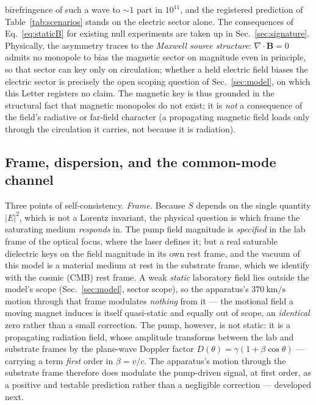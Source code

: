 \documentclass[aps,prd,twocolumn,superscriptaddress,nofootinbib,longbibliography]{revtex4-2}
\begin{document}
birefringence of such a wave to $\sim\!1$ part in $10^{11}$, and the registered
prediction of Table~\ref{tab:scenarios} stands on the electric sector alone.
The consequences of Eq.~\eqref{eq:staticB} for existing null experiments are
taken up in Sec.~\ref{sec:signature}. Physically, the asymmetry traces to the
\emph{Maxwell source structure}: $\nabla\cdot\mathbf B=0$ admits no monopole to
bias the magnetic sector on magnitude even in principle, so that sector can key
only on circulation; whether a held electric field biases the electric sector is
precisely the open scoping question of Sec.~\ref{sec:model}, on which this Letter
registers no claim. The magnetic key is thus grounded in the structural fact that
magnetic monopoles do not exist; it is \emph{not} a consequence of the field's
radiative or far-field character (a propagating magnetic field loads only through
the circulation it carries, not because it is radiation).

\subsection{Frame, dispersion, and the common-mode channel}

Three points of self-consistency. \emph{Frame.} Because $S$ depends on the single
quantity $|E|^2$, which is not a Lorentz invariant, the physical question is which
frame the saturating medium \emph{responds} in. The pump field magnitude is
\emph{specified} in the lab frame of the optical focus, where the laser defines
it; but a real saturable dielectric keys on the field magnitude in its own rest
frame, and the vacuum of this model is a material medium at rest in the substrate
frame, which we identify with the cosmic (CMB) rest frame. A weak \emph{static}
laboratory field lies outside the model's scope (Sec.~\ref{sec:model}, sector
scope), so the apparatus's $\SI{370}{\kilo\meter\per\second}$ motion through that
frame modulates \emph{nothing} from it --- the motional field a moving magnet
induces is itself quasi-static and equally out of scope, an \emph{identical} zero
rather than a small correction. The pump, however, is not static: it is a propagating radiation
field, whose amplitude transforms between the lab and substrate frames by the
plane-wave Doppler factor $D(\theta)=\gamma(1+\beta\cos\theta)$ --- carrying a term
\emph{first} order in $\beta=v/c$. The apparatus's motion through the substrate
frame therefore does modulate the pump-driven signal, at first order, as a positive
and testable prediction rather than a negligible correction --- developed next.
\end{document}

